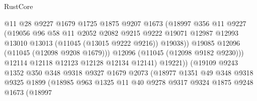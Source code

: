 \begin{lexlean}{RustCore}
\begin{coremodule}
                                  @11
                                  @28
                                  @9227
                                  @1679
                                  @1725
                                  @1875
                                  @9207
                                  @1673
                                  (@18997
                                    @356
                                    @11
                                    @9227
                                    (@19056
                                      @96
                                      @58
                                      @11
                                      @2052
                                      @2082
                                      @9215
                                      @9222
                                      @19071
                                      @12987
                                      @12993
                                      @13010
                                      @13013
                                      (@11045 (@13015 @9222 @9216))
                                      @19038))
                                  @19085
                                  @12096
                                  (@11045 (@12098 @9208 @1679)))
                                @12096
                                (@11045 (@12098 @9182 @9230)))
                              @12114
                              @12118
                              @12123
                              @12128
                              @12134
                              @12141)
                            @19221))
                        (@19109
                          @9243
                          @1352
                          @350
                          @348
                          @9318
                          @9327
                          @1679
                          @2073
                          (@18977
                            @1351
                            @49
                            @348
                            @9318
                            @9325
                            @1899
                            (@18985
                              @963
                              @1325
                              @11
                              @40
                              @9278
                              @9317
                              @9324
                              @1875
                              @9248
                              @1673
                              (@18997

\end{coremodule}
\end{lexlean}
